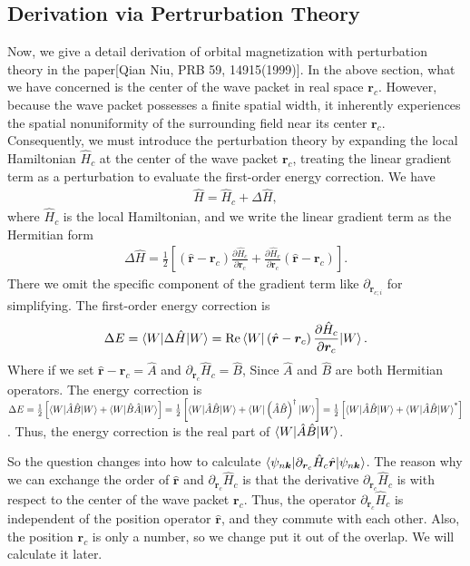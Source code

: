 \documentclass[12pt, oneside]{article}
\newcommand{\pa}{\partial}
\newcommand{\mr}[1]{\mathrm{#1}}
\newcommand{\p}[1]{\left(#1\right)}
\newcommand{\bb}[1]{\left[#1\right]}
\numberwithin{equation}{subsection}
\begin{document}
\subsection{Derivation via Pertrurbation Theory}
Now, we give a detail derivation of orbital magnetization with perturbation theory in the paper[Qian Niu, PRB 59, 14915(1999)]. In the above section, what we have concerned is the center of the wave packet in real space \(\bm{r}_c\). However, because the wave packet possesses a finite spatial width, it inherently experiences the spatial nonuniformity of the surrounding field near its center \(\bm r_{c}\). Consequently, we must introduce the perturbation theory by expanding the local Hamiltonian \(\hat{H}_c\) at the center of the wave packet \(\bm{r}_c\), treating the linear gradient term as a perturbation to evaluate the first-order energy correction. We have 
\begin{align}
	\hat{H} = \hat{H}_c + \Delta \hat{H},
\end{align}
where  \(\hat{H}_c\) is the local Hamiltonian, and we write the linear gradient term as the Hermitian form 
\begin{align}
	\Delta \hat{H} = \frac12 \bb{\p{\hat{\bm{r}}- \bm{r}_c} \frac{\pa \hat{H}_{c}}{\pa \bm{r}_c} + \frac{\pa \hat{H}_c}{\pa \bm{r}_c} \p{\hat{\bm{r}} - \bm{r}_c}}.
\end{align}
There we omit the specific component of the gradient term like \(\pa_{\bm{r}_{c;i}}\) for simplifying. The first-order energy correction is
\begin{align}
	\begin{split}
		\Delta E = \braket{W | \Delta \hat{H} | W}  = \mr{Re} \braket{W | \p{\hat{\bm{r}}- \bm{r}_c} \frac{\pa \hat{H}_{c}}{\pa \bm{r}_c} | W}.
	\end{split}
\end{align}
Where if we set \(\hat{\bm{r}}- \bm{r}_c = \hat{A}\) and \(\pa_{\bm{r}_c} \hat{H}_c = \hat{B}\), Since \(\hat{A}\) and \(\hat{B}\) are both Hermitian operators. The energy correction is \(\Delta E = \frac12 \bb{\braket{W | \hat{A} \hat{B} | W} + \braket{W | \hat{B} \hat{A} | W}} = \frac12 \bb{\braket{W | \hat{A} \hat{B} | W} + \braket{W | \p{\hat{A} \hat{B}}^{\dagger} | W}} =  \frac12 \bb{\braket{W | \hat{A} \hat{B} | W} + \braket{W | \hat{A} \hat{B} | W}^{*}} \). Thus, the energy correction is the real part of \(\braket{W | \hat{A} \hat{B} | W}\). 

So the question changes into how to calculate \(\braket{\psi_{n \bm{k}} | \pa_{\bm{r}_c} \hat{H}_c \hat{\bm{r}} | \psi_{n \bm{k}}}\). The reason why we can exchange the order of \(\hat{\bm{r}}\) and \(\pa_{\bm{r}_c} \hat{H}_c \) is that the derivative \(\pa_{\bm{r}_c} \hat{H}_c\) is with respect to the center of the wave packet \(\bm{r}_c\). Thus, the operator \(\pa_{\bm{r}_c} \hat{H}_c \) is independent of the position operator \(\hat{\bm{r}}\), and they commute with each other. Also, the position \(\bm{r}_c\) is only a number, so we change put it out of the overlap. We will calculate it later.
\end{document}
